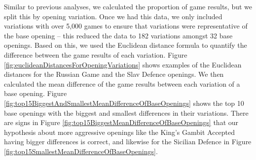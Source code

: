 \documentclass[a4paper, 11pt]{article}
\begin{document}
Similar to previous analyses, we calculated the proportion of game results, but we split this by opening variation. Once we had this data, we only included variations with over 5,000 games to ensure that variations were representative of the base opening -- this reduced the data to 182 variations amongst 32 base openings. Based on this, we used the Euclidean distance formula to quantify the difference between the game results of each variation. Figure \ref{fig:euclideanDistancesForOpeningVariations} shows examples of the Euclidean distances for the Russian Game and the Slav Defence openings. We then calculated the mean difference of the game results between each variation of a base opening. Figure \ref{fig:top15BiggestAndSmallestMeanDifferenceOfBaseOpenings} shows the top 10 base openings with the biggest and smallest differences in their variations. There are signs in Figure \ref{fig:top15BiggestMeanDifferenceOfBaseOpenings} that our hypothesis about more aggressive openings like the King's Gambit Accepted having bigger differences is correct, and likewise for the Sicilian Defence in Figure \ref{fig:top15SmallestMeanDifferenceOfBaseOpenings}.
\end{document}
